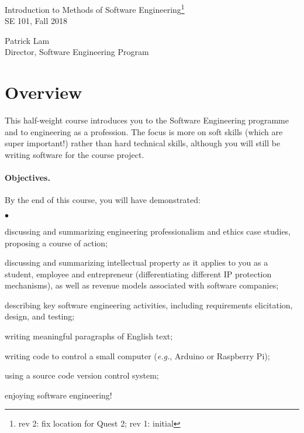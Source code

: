 \documentclass[11pt,onecolumn]{article}
\newcommand{\eg}{\emph{e.g.}\xspace}
\newcommand{\squishlist}{
 \begin{list}{$\bullet$}
  { \setlength{\itemsep}{0pt}
     \setlength{\parsep}{3pt}
     \setlength{\topsep}{3pt}
     \setlength{\partopsep}{0pt}
     \setlength{\leftmargin}{1.5em}
     \setlength{\labelwidth}{1em}
     \setlength{\labelsep}{0.5em} } }
\newcommand{\squishend}{
  \end{list}  }
\begin{document}
\pagestyle{empty}

\renewcommand{\arraystretch}{0.92}

\begin{center}
\begin{Large}
Introduction to Methods of Software Engineering\footnote{rev 2: fix location for Quest 2; rev 1: initial}\\
SE 101, Fall 2018\\[1em]
\end{Large}

\begin{large}
Patrick Lam \\
Director, Software Engineering Program\\
\end{large}
\end{center}

\section{Overview}
This half-weight course introduces you to the Software Engineering programme and to engineering as a profession. The focus is more on soft skills (which are super important!) rather than hard technical skills, although you will still be writing software for the course project.

\paragraph{Objectives.}
By the end of this course, you will have demonstrated:
\squishlist
\item discussing and summarizing engineering professionalism and ethics case studies, proposing a course of action;
\item discussing and summarizing intellectual property as it applies to you as a student, employee and entrepreneur (differentiating different IP protection mechanisms), as well as revenue models associated with software companies; 
\item describing key software engineering activities, including requirements elicitation, design, and testing;
\item writing meaningful paragraphs of English text;
\item writing code to control a small computer (\eg, Arduino or
Raspberry Pi);
\item using a source code version control system; 
\item enjoying software engineering!
\squishend
\end{document}
